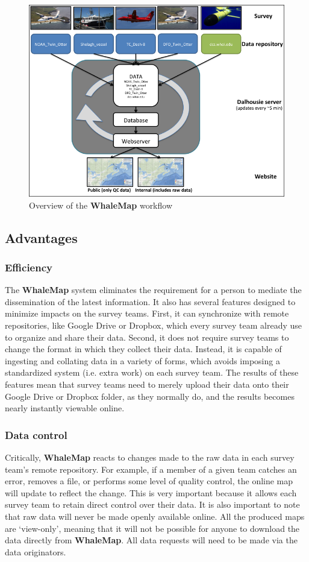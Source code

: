 \documentclass[11pt, letterpaper]{article}
\begin{document}
\begin{figure}[h]
	\centering
	\includegraphics[width=0.7\linewidth]{diagram}
	\caption{Overview of the \textbf{WhaleMap} workflow}
	\label{fig:outline}
\end{figure}

\subsection{Advantages}

\subsubsection{Efficiency}

The \textbf{WhaleMap} system eliminates the requirement for a person to mediate the dissemination of the latest information. It also has several features designed to minimize impacts on the survey teams. First, it can synchronize with remote repositories, like Google Drive or Dropbox, which every survey team already use to organize and share their data. Second, it does not require survey teams to change the format in which they collect their data. Instead, it is capable of ingesting and collating data in a variety of forms, which avoids imposing a standardized system (i.e. extra work) on each survey team. The results of these features mean that survey teams need to merely upload their data onto their Google Drive or Dropbox folder, as they normally do, and the results becomes nearly instantly viewable online.

\subsubsection{Data control}

Critically, \textbf{WhaleMap} reacts to changes made to the raw data in each survey team's remote repository. For example, if a member of a given team catches an error, removes a file, or performs some level of quality control, the online map will update to reflect the change. This is very important because it allows each survey team to retain direct control over their data. It is also important to note that raw data will never be made openly available online. All the produced maps are `view-only', meaning that it will not be possible for anyone to download the data directly from \textbf{WhaleMap}. All data requests will need to be made via the data originators.
\end{document}
